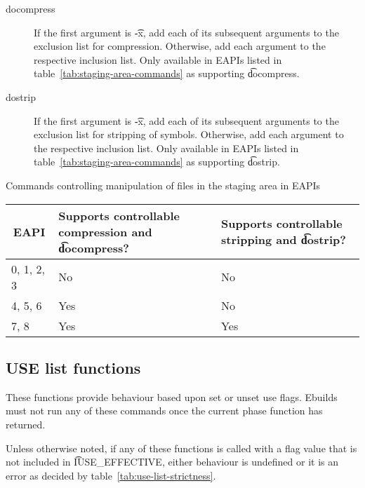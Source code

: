 \begin{description}
\item[docompress] If the first argument is \t{-x}, add each of its subsequent arguments to the
    exclusion list for compression. Otherwise, add each argument to the respective inclusion list.
    Only available in EAPIs listed in table~\ref{tab:staging-area-commands} as supporting
    \t{docompress}.

\item[dostrip] If the first argument is \t{-x}, add each of its subsequent arguments to the
    exclusion list for stripping of symbols. Otherwise, add each argument to the respective
    inclusion list. Only available in EAPIs listed in table~\ref{tab:staging-area-commands} as
    supporting \t{dostrip}.
\end{description}

\begin{centertable}{Commands controlling manipulation of files in the staging area in EAPIs}
    \label{tab:staging-area-commands}
    \begin{tabular}{lll}
      \toprule
      \multicolumn{1}{c}{\textbf{EAPI}} &
      \multicolumn{1}{P{13.5em}}{\textbf{Supports controllable compression and \t{docompress}?}} &
      \multicolumn{1}{P{10.5em}}{\textbf{Supports controllable stripping and \t{dostrip}?}} \\
      \midrule
      0, 1, 2, 3        & No  & No  \\
      4, 5, 6           & Yes & No  \\
      7, 8              & Yes & Yes \\
      \bottomrule
    \end{tabular}
\end{centertable}

\subsection{USE list functions}
These functions provide behaviour based upon set or unset use flags. Ebuilds must not run any of
these commands once the current phase function has returned.

Unless otherwise noted, if any of these functions is called with a flag value that is not included
in \t{IUSE_EFFECTIVE}, either behaviour is undefined or it is an error as decided by
table~\ref{tab:use-list-strictness}.

